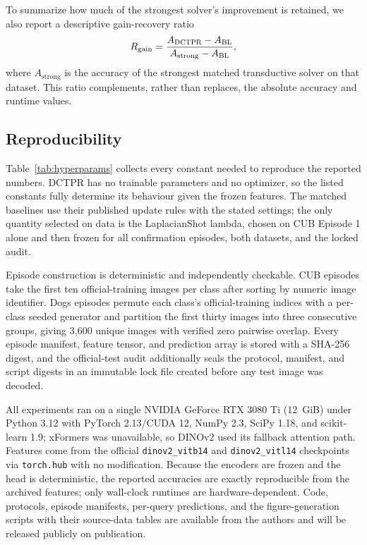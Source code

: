 \documentclass[]{spie}
\newcommand{\method}{\textsc{DCTPR}\xspace}
\begin{document}
To summarize how much of the strongest solver's improvement is retained, we
also report a descriptive gain-recovery ratio
\begin{equation}
 R_{\mathrm{gain}}=
 \frac{A_{\method}-A_{\mathrm{BL}}}
 {A_{\mathrm{strong}}-A_{\mathrm{BL}}},
 \label{eq:recovery}
\end{equation}
where $A_{\mathrm{strong}}$ is the accuracy of the strongest matched
transductive solver on that dataset. This ratio complements, rather than
replaces, the absolute accuracy and runtime values.

\subsection{Reproducibility}
\label{sec:reproducibility}

Table~\ref{tab:hyperparams} collects every constant needed to reproduce the
reported numbers. \method has no trainable parameters and no optimizer, so the
listed constants fully determine its behaviour given the frozen features. The
matched baselines use their published update rules with the stated settings; the
only quantity selected on data is the LaplacianShot lambda, chosen on CUB
Episode 1 alone and then frozen for all confirmation episodes, both datasets, and
the locked audit.

Episode construction is deterministic and independently checkable. CUB episodes
take the first ten official-training images per class after sorting by numeric
image identifier. Dogs episodes permute each class's official-training indices
with a per-class seeded generator and partition the first thirty images into
three consecutive groups, giving 3,600 unique images with verified zero pairwise
overlap. Every episode manifest, feature tensor, and prediction array is stored
with a SHA-256 digest, and the official-test audit additionally seals the
protocol, manifest, and script digests in an immutable lock file created before
any test image was decoded.

All experiments ran on a single NVIDIA GeForce RTX 3080 Ti (12~GiB) under Python
3.12 with PyTorch 2.13/CUDA 12, NumPy 2.3, SciPy 1.18, and scikit-learn 1.9;
xFormers was unavailable, so DINOv2 used its fallback attention path. Features
come from the official \texttt{dinov2\_vitb14} and \texttt{dinov2\_vitl14}
checkpoints via \texttt{torch.hub} with no modification. Because the encoders are
frozen and the head is deterministic, the reported accuracies are exactly
reproducible from the archived features; only wall-clock runtimes are
hardware-dependent. Code, protocols, episode manifests, per-query predictions,
and the figure-generation scripts with their source-data tables are available
from the authors and will be released publicly on publication.
\end{document}
